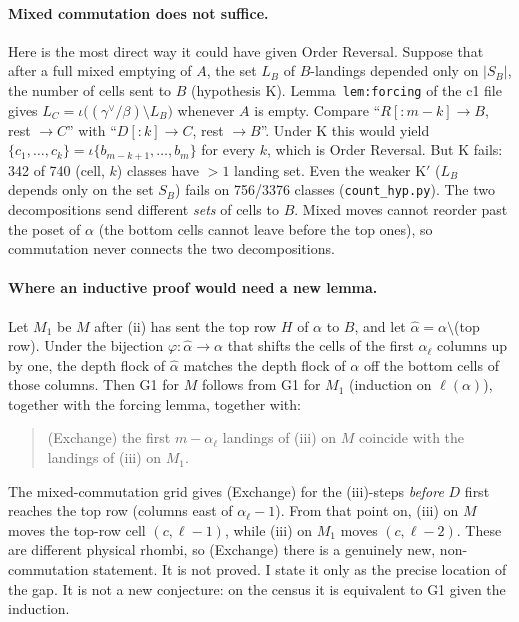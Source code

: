 \documentclass[11pt]{article}
\theoremstyle{definition}
\begin{document}
\paragraph{Mixed commutation does not suffice.} Here is the most direct way it could have given Order Reversal. Suppose that after a full mixed emptying of
$A$, the set $L_B$ of $B$-landings depended only on $|S_B|$, the number of cells sent to $B$ (hypothesis K). Lemma~\texttt{lem:forcing} of the c1 file
gives $L_C=\iota\big((\gamma^\vee/\beta)\setminus L_B\big)$ whenever $A$ is empty. Compare ``$R[{:}m{-}k]\to B$, rest $\to C$''
with ``$D[{:}k]\to C$, rest $\to B$''. Under K this would yield $\{c_1,\dots,c_k\}=\iota\{b_{m-k+1},\dots,b_m\}$ for every $k$, which is Order
Reversal. But K fails: 342 of 740 (cell, $k$) classes have $>1$ landing set. Even the weaker K$'$ ($L_B$ depends only on the
set $S_B$) fails on 756/3376 classes (\texttt{count\_hyp.py}). The two decompositions send different \emph{sets} of cells to
$B$. Mixed moves cannot reorder past the poset of $\alpha$ (the bottom cells cannot leave before the top ones), so
commutation never connects the two decompositions.

\paragraph{Where an inductive proof would need a new lemma.} Let $M_1$ be $M$ after (ii) has sent the top row
$H$ of $\alpha$ to $B$, and let $\hat\alpha=\alpha\setminus$(top row). Under the bijection $\varphi:\hat\alpha\to\alpha$ that shifts
the cells of the first $\alpha_\ell$ columns up by one, the depth flock of $\hat\alpha$ matches the depth flock of $\alpha$ off
the bottom cells of those columns. Then G1 for $M$ follows from G1 for $M_1$ (induction on $\ell(\alpha)$), together with the
forcing lemma, together with:
\begin{quote}(Exchange) the first $m-\alpha_\ell$ landings of (iii) on $M$ coincide with the landings of (iii) on $M_1$.\end{quote}
The mixed-commutation grid gives (Exchange) for the (iii)-steps \emph{before} $D$ first reaches the top row (columns east of
$\alpha_\ell-1$). From that point on, (iii) on $M$ moves the top-row cell $(c,\ell-1)$, while (iii) on $M_1$ moves
$(c,\ell-2)$. These are different physical rhombi, so (Exchange) there is a genuinely new, non-commutation statement. It is not
proved. I state it only as the precise location of the gap. It is not a new conjecture: on the census it is equivalent to G1
given the induction.
\end{document}
